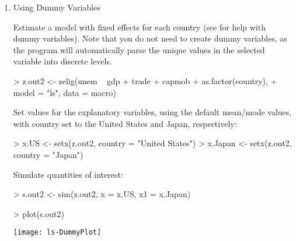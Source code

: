 \begin{enumerate}
\item Using Dummy Variables

Estimate a model with fixed effects for each country (see
 for help with dummy variables).  Note that you do not
need to create dummy variables, as the program will automatically
parse the unique values in the selected variable into discrete levels.  
\begin{Schunk}
\begin{Sinput}
>  z.out2 <- zelig(unem ~ gdp + trade + capmob + as.factor(country), 
+                   model = "ls", data = macro)
\end{Sinput}
\end{Schunk}
Set values for the explanatory variables, using the default mean/mode
values, with country set to the United States and Japan, respectively:
\begin{Schunk}
\begin{Sinput}
>  x.US <- setx(z.out2, country = "United States")
>  x.Japan <- setx(z.out2, country = "Japan")
\end{Sinput}
\end{Schunk}
Simulate quantities of interest:
\begin{Schunk}
\begin{Sinput}
>  s.out2 <- sim(z.out2, x = x.US, x1 = x.Japan)
\end{Sinput}
\end{Schunk}
\begin{center}
\begin{Schunk}
\begin{Sinput}
>  plot(s.out2)
\end{Sinput}
\end{Schunk}
\texttt{[image: ls-DummyPlot]}
\end{center}

%
%
\end{enumerate}

